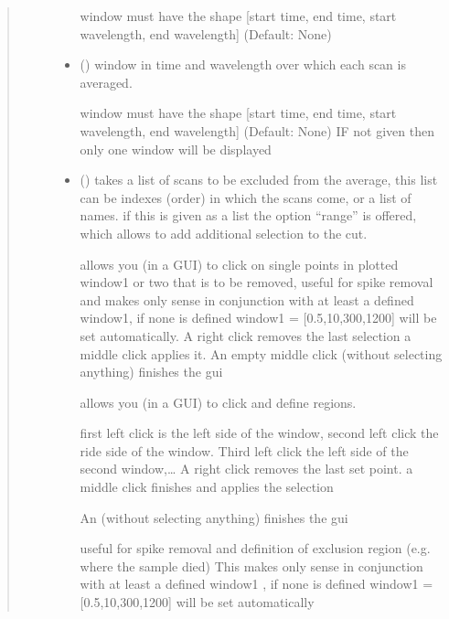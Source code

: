 \documentclass[letterpaper,10pt,english]{sphinxmanual}
\begin{document}
\begin{fulllineitems}
\begin{quote}
\begin{description}
\begin{itemize}
window must have the shape {[}start time, end time, start wavelength, end wavelength{]}
(Default: None)


\item {} 
 (\sphinxstyleliteralemphasis{\sphinxupquote{, }}) \textendash{} 
window in time and wavelength over which each scan is averaged.

window must have the shape {[}start time, end time, start wavelength, end wavelength{]}
(Default: None) IF not given then only one window will be displayed


\item {} 
 (\sphinxstyleliteralemphasis{\sphinxupquote{, }}\sphinxstyleliteralemphasis{\sphinxupquote{, }}) \textendash{} 
takes a list of scans to be excluded from the average, this list can be indexes (order)
in which the scans come, or a list of names. if this is given as a list the option “range”
is offered, which allows to add additional selection to the cut.

 allows you (in a GUI) to click on single points in plotted window1 or two that
is to be removed, useful for spike removal and makes only sense in conjunction with at least
a defined window1, if none is defined window1 = {[}0.5,10,300,1200{]} will be set automatically.
A right click removes the last selection a middle click applies it. An empty middle click
(without selecting anything) finishes the gui

 allows you (in a GUI) to click and define regions.

first left click is the left side of the window, second left click the ride side of the window.
Third left click the left side of the second window,… A right click removes the last set point.
a middle click finishes and applies the selection

An  (without selecting anything) finishes the gui

useful for spike removal and definition of exclusion region (e.g. where the sample died)
This makes only sense in conjunction with at least a defined window1 ,
if none is defined window1 = {[}0.5,10,300,1200{]} will be set automatically



\end{itemize}
\end{description}
\end{quote}
\end{fulllineitems}
\end{document}
